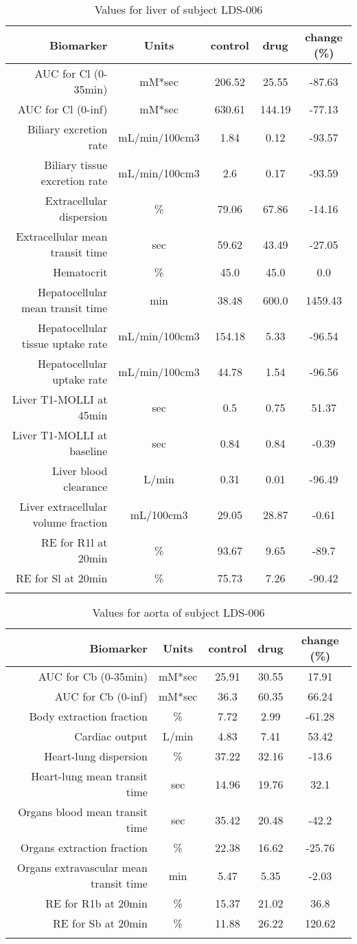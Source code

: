 \documentclass{epflreport}%
\begin{document}
%
\clearpage%
\begin{longtable}{rcccc}%
\hline%
Biomarker&Units&control&drug&change (\%)\\%
\hline%
AUC for Cl (0{-}35min)&mM*sec&206.52&25.55&{-}87.63\\%
AUC for Cl (0{-}inf)&mM*sec&630.61&144.19&{-}77.13\\%
Biliary excretion rate&mL/min/100cm3&1.84&0.12&{-}93.57\\%
Biliary tissue excretion rate&mL/min/100cm3&2.6&0.17&{-}93.59\\%
Extracellular dispersion&\%&79.06&67.86&{-}14.16\\%
Extracellular mean transit time&sec&59.62&43.49&{-}27.05\\%
Hematocrit&\%&45.0&45.0&0.0\\%
Hepatocellular mean transit time&min&38.48&600.0&1459.43\\%
Hepatocellular tissue uptake rate&mL/min/100cm3&154.18&5.33&{-}96.54\\%
Hepatocellular uptake rate&mL/min/100cm3&44.78&1.54&{-}96.56\\%
Liver T1{-}MOLLI at 45min&sec&0.5&0.75&51.37\\%
Liver T1{-}MOLLI at baseline&sec&0.84&0.84&{-}0.39\\%
Liver blood clearance&L/min&0.31&0.01&{-}96.49\\%
Liver extracellular volume fraction&mL/100cm3&29.05&28.87&{-}0.61\\%
RE for R1l at 20min&\%&93.67&9.65&{-}89.7\\%
RE for Sl at 20min&\%&75.73&7.26&{-}90.42\\%
\hline%
\caption{Values for liver of subject LDS-006} \\%
\end{longtable}%
\begin{longtable}{rcccc}%
\hline%
Biomarker&Units&control&drug&change (\%)\\%
\hline%
AUC for Cb (0{-}35min)&mM*sec&25.91&30.55&17.91\\%
AUC for Cb (0{-}inf)&mM*sec&36.3&60.35&66.24\\%
Body extraction fraction&\%&7.72&2.99&{-}61.28\\%
Cardiac output&L/min&4.83&7.41&53.42\\%
Heart{-}lung dispersion&\%&37.22&32.16&{-}13.6\\%
Heart{-}lung mean transit time&sec&14.96&19.76&32.1\\%
Organs blood mean transit time&sec&35.42&20.48&{-}42.2\\%
Organs extraction fraction&\%&22.38&16.62&{-}25.76\\%
Organs extravascular mean transit time&min&5.47&5.35&{-}2.03\\%
RE for R1b at 20min&\%&15.37&21.02&36.8\\%
RE for Sb at 20min&\%&11.88&26.22&120.62\\%
\hline%
\caption{Values for aorta of subject LDS-006} \\%
\end{longtable}%
\clearpage%
\end{document}
